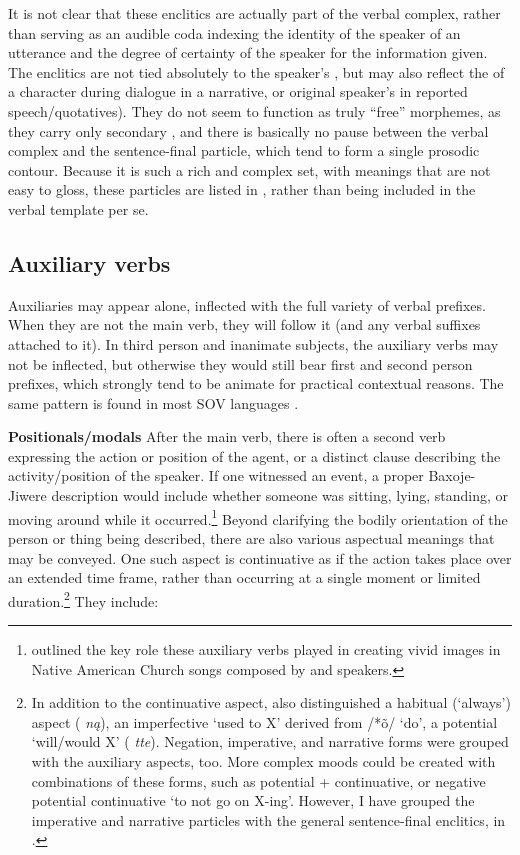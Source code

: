 \documentclass[output=paper]{LSP/langsci}
\begin{document}
It is not clear that these enclitics are actually part of the verbal complex, rather than serving as an audible coda indexing the  identity of the speaker of an utterance and the degree of certainty of the speaker for the information given. The enclitics are not tied absolutely to the speaker's , but may also reflect the  of a character during dialogue in a narrative, or original speaker's  in reported speech/quotatives).  They do not seem to function as truly ``free'' morphemes, as they carry only secondary , and there is basically no pause between the verbal complex and the sentence-final particle, which tend to form a single prosodic contour.  Because it is such a rich and complex set, with meanings that are not easy to gloss, these particles are listed in , rather than being included in the verbal template per se.   

\subsection{Auxiliary verbs}
Auxiliaries may appear alone, inflected with the full variety of verbal prefixes. When they are not the main verb, they will follow it (and any verbal suffixes attached to it).  In third person and inanimate subjects, the auxiliary verbs may not be inflected, but otherwise they would still bear first and second person prefixes, which strongly tend to be animate for practical contextual reasons.  The same pattern is found in most SOV languages \citep[490]{Rankin2005b}.  

\vspace{1em}
\textbf{Positionals/modals}  After the main verb, there is often a second verb expressing the action or position of the agent, or a distinct clause describing the activity/position of the speaker.  If one witnessed an event, a proper Baxoje-Jiwere description would include whether someone was sitting, lying, standing, or moving around while it occurred.\footnote{\citealt{Davidson1997} outlined the key role these auxiliary verbs played in creating vivid images in Native American Church songs composed by  and  speakers.}  Beyond clarifying the bodily orientation of the person or thing being described, there are also various aspectual meanings that may be conveyed.  One such aspect is continuative as if the action takes place over an extended time frame, rather than occurring at a single moment or limited duration.\footnote{In addition to the continuative aspect, \citet[484--485]{Rankin2005b} also distinguished a habitual (`always') aspect ( \textit{n\k{a}}), an imperfective `used to X' derived from  /*\~o/ `do', a potential `will/would X' ( \textit{tte}). Negation, imperative, and narrative forms were grouped with the auxiliary aspects, too. More complex moods could be created with combinations of these forms, such as potential + continuative, or negative potential continuative `to not go on X-ing'. However, I have grouped the imperative and narrative particles with the general sentence-final enclitics, in .} They include:
\end{document}
